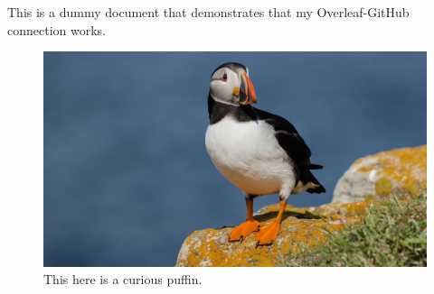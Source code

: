 \documentclass{report}
\begin{document}
This is a dummy document that demonstrates that my Overleaf-GitHub connection works.

\begin{figure}[h]
\caption{This here is a curious puffin.}
\centering
\includegraphics[width=\textwidth]{puffin}
\end{figure}
\end{document}
